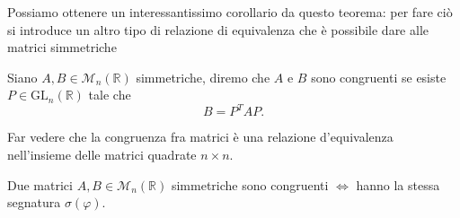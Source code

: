 Possiamo ottenere un interessantissimo corollario da questo teorema: per fare ciò si introduce un altro tipo di relazione di equivalenza che è possibile dare alle matrici simmetriche
\begin{definition}
	Siano $A, B \in \mathcal{M}_n(\mathbb{R})$ simmetriche, diremo che $A$ e $B$ sono congruenti se esiste $P \in \text{GL}_n(\mathbb{R})$ tale che
	$$
		B = P^T A P.
	$$
\end{definition}
\begin{exercise}
	Far vedere che la congruenza fra matrici è una relazione d'equivalenza nell'insieme delle matrici quadrate $n \times n$.
\end{exercise}
\begin{cor}
	Due matrici $A, B \in \mathcal{M}_n(\mathbb{R})$ simmetriche sono congruenti $\iff$ hanno la stessa segnatura $\sigma(\varphi)$.
\end{cor}
